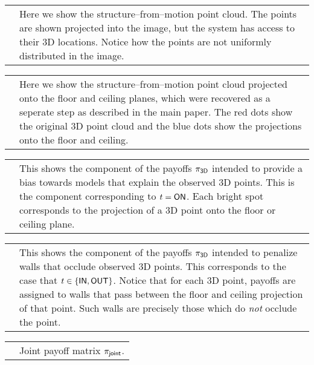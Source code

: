 \begin{tabular}{IT}
   &
  Here we show the structure--from--motion point cloud. The points are
  shown projected into the image, but the system has access to their
  3D locations. Notice how the points are not uniformly distributed in
  the image.
\end{tabular}

\begin{tabular}{IT}
   &
  Here we show the structure--from--motion point cloud projected onto
  the floor and ceiling planes, which were recovered as a seperate
  step as described in the main paper. The red dots show the original
  3D point cloud and the blue dots show the projections onto the floor
  and ceiling.\\
\end{tabular}

\begin{tabular}{IT}
   &
  This shows the component of the payoffs $\pi_{\textsf{3D}}$ intended to
  provide a bias towards models that explain the observed 3D
  points. This is the component corresponding to $t=\textsf{ON}$. Each bright
  spot corresponds to the projection of a 3D point onto the floor or
  ceiling plane.
\end{tabular}

\begin{tabular}{IT}
   &
  This shows the component of the payoffs $\pi_{\textsf{3D}}$ intended to
  penalize walls that occlude observed 3D points. This corresponds to
  the case that $t\in\{\textsf{IN},\textsf{OUT}\}$. Notice that for each 3D point,
  payoffs are assigned to walls that pass between the floor and
  ceiling projection of that point. Such walls are precisely those
  which do \textit{not} occlude the point.\\
\end{tabular}

\begin{tabular}{IT}
   &
  Joint payoff matrix $\pi_{\textsf{joint}}$. \\
\end{tabular}
